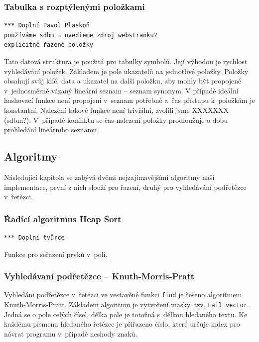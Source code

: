 \documentclass[a4paper, 12pt]{article}
\begin{document}
\subsubsection{Tabulka s rozptýlenými položkami}
\begin{verbatim}
*** Doplní Pavol Plaskoň
používáme sdbm = uvedieme zdroj webstranku?
explicitně řazené položky
\end{verbatim}
Tato datová struktura je použitá pro tabulky symbolů. Její výhodou je rychlost
vyhledávání položek. Základem je pole ukazatelů na jednotlivé položky. Položky
obsahují svůj klíč, data a ukazatel na další položku, aby mohly být propojené
v~jednosměrně vázaný lineární seznam -- seznam synonym. V případě ideální
hashovací funkce není propojení v~seznam potřebné a~čas přístupu k~položkám je
konstantní. Nalezení takové funkce není triviální, zvolili jsme XXXXXXX (sdbm?).
V~případě konfliktu se čas nalezení položky prodloužuje o dobu prohledání
lineárního seznamu.

\subsection{Algoritmy}

Následující kapitola se zabývá dvěmi nejzajímavějšími algoritmy naší
implementace, první z nich slouží pro řazení, druhý pro vyhledávání
podřetězce v~řetězci.

\subsubsection{Řadící algoritmus Heap Sort}
\begin{verbatim}
*** Doplní tvůrce
\end{verbatim}
Funkce pro seřazení prvků v~poli.

\subsubsection{Vyhledávaní podřetězce -- Knuth-Morris-Pratt}
Vyhledání podřetězce v~řetězci ve vestavěné funkci \texttt{find} je řešeno
algoritmem Knuth-Morris-Pratt. Základem algoritmu je vytvoření masky, tzv.
\texttt{Fail vector}. Jedná se o pole celých čísel, délka pole je totožná
s~délkou hledaného textu. Ke každému písmenu hledaného řetězce je přiřazeno
číslo, které určuje index pro návrat programu v~případě neshody znaků.
\end{document}
